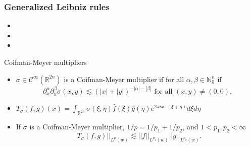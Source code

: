 \documentclass[xcolor=dvipsnames]{beamer}
\newcommand{\hcline}{1/p=1/p_1+1/p_2}
\begin{document}
\begin{frame}\frametitle{Generalized Leibniz rules}

\begin{itemize}
\item
\bigskip
\item
\bigskip
\item 
\end{itemize}

\end{frame}

\begin{frame}{Coifman-Meyer multipliers}
\begin{itemize}
\item $\sigma \in \mathcal{C}^\infty(\mathbb{R}^{2n})$ is a Coifman-Meyer multiplier if for all $\alpha,\beta \in \mathbb{N}^n_0$ if 
\[ \partial^\alpha_x \partial^\beta_y \sigma(x,y) \lesssim (|x| + |y|)^{-|\alpha| - |\beta|} \text{ for all } (x,y)\neq (0,0). \]

\bigskip

\item $T_\sigma(f,g)(x) = \int_{\mathbb{R}^{2n}} \sigma(\xi,\eta) \widehat{f}(\xi)\widehat{g}(\eta) e^{2\pi i x\cdot (\xi + \eta)} d\xi d\eta$

\bigskip

\item If $\sigma$ is a Coifman-Meyer multiplier, $\hcline$, and $1<p_1,p_2<\infty$ \[||T_\sigma(f,g)||_{L^p(w)} \lesssim ||f||_{L^{p_1}(w)} ||g||_{L^{p_2}(w)}.\]
\end{itemize}

\end{frame}
\end{document}
